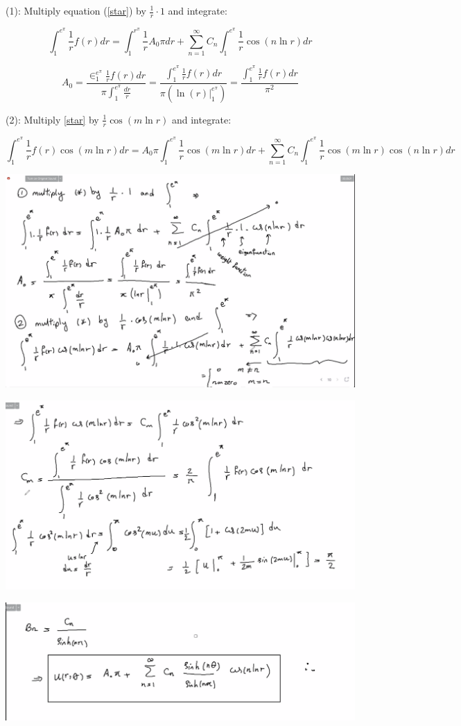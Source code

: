 \documentclass{article}
\begin{document}
(1): Multiply equation (\ref{star}) by $\frac{1}{r} \cdot 1$ and integrate:

$$\int_1^{e^\pi} \frac{1}{r} f(r) dr = \int_1^{r^\pi} \frac{1}{r} A_0 \pi dr + \sum_{n=1}^\infty C_n \int_1^{e^\pi} \frac{1}{r} \cos(n \ln r) dr$$

$$A_0 = \frac{\in_1^{e^\pi} \frac{1}{r} f(r) dr}{\pi \int_1^{e^\pi} \frac{dr}{r}} = \frac{\int_1^{e^\pi} \frac{1}{r} f(r) dr}{\pi \left( \left. \ln(r) \right|_1^{e^\pi} \right)} = \frac{\int_1^{e^\pi} \frac{1}{r} f(r) dr}{\pi^2}$$

(2): Multiply \ref{star} by $\frac{1}{r} \cos(m \ln r)$ and integrate:

$$\int_1^{e^\pi} \frac{1}{r} f(r) \cos(m \ln r) dr = A_0 \pi \int_1^{e^\pi} \frac{1}{r} \cos(m \ln r) dr + \sum_{n=1}^\infty C_n \int_1^{e^\pi} \frac{1}{r} \cos(m \ln r) \cos(n \ln r) dr$$


\begin{center}
    \includegraphics[width = 0.9 \textwidth]{8.png}
\end{center}

\begin{center}
    \includegraphics[width = 0.9 \textwidth]{10.png}
\end{center}

\begin{center}
    \includegraphics[width = 0.9 \textwidth]{11.png}
\end{center}
\end{document}
